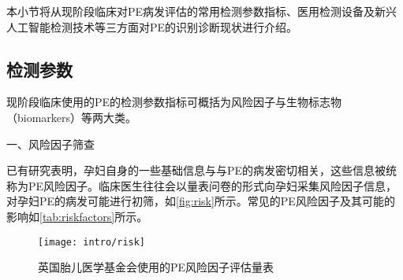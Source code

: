 本小节将从现阶段临床对PE病发评估的常用检测参数指标、医用检测设备及新兴人工智能检测技术等三方面对PE的识别诊断现状进行介绍。

\subsection{检测参数}
现阶段临床使用的PE的检测参数指标可概括为风险因子与生物标志物（biomarkers）等两大类。

一、风险因子筛查

已有研究表明，孕妇自身的一些基础信息与与PE的病发密切相关，这些信息被统称为PE风险因子\cite{Magee2008,FIGO,Lowe2015,Heazell2010}。临床医生往往会以量表问卷的形式向孕妇采集风险因子信息，
对孕妇PE的病发可能进行初筛\cite{risks}，如\autoref{fig:risk}所示。常见的PE风险因子及其可能的影响如\autoref{tab:riskfactors}所示。
\begin{figure}[htbp]
    \centering
    \texttt{[image: intro/risk]}
    \caption[英国胎儿医学基金会使用的PE风险因子评估量表]{\label{fig:risk}英国胎儿医学基金会使用的PE风险因子评估量表\cite{risks}}
\end{figure}

